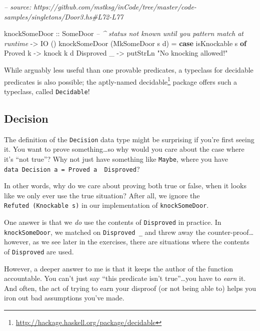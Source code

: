 \documentclass[]{article}
\newenvironment{Shaded}{}{}
\newcommand{\CommentTok}[1]{\textcolor[rgb]{0.38,0.63,0.69}{\textit{#1}}}
\newcommand{\DataTypeTok}[1]{\textcolor[rgb]{0.56,0.13,0.00}{#1}}
\newcommand{\FunctionTok}[1]{\textcolor[rgb]{0.02,0.16,0.49}{#1}}
\newcommand{\KeywordTok}[1]{\textcolor[rgb]{0.00,0.44,0.13}{\textbf{#1}}}
\newcommand{\NormalTok}[1]{#1}
\newcommand{\OtherTok}[1]{\textcolor[rgb]{0.00,0.44,0.13}{#1}}
\newcommand{\StringTok}[1]{\textcolor[rgb]{0.25,0.44,0.63}{#1}}
\renewcommand{\href}[2]{#2\footnote{\url{#1}}}
\begin{document}
\begin{Shaded}
\begin{Highlighting}[]
\CommentTok{-- source: https://github.com/mstksg/inCode/tree/master/code-samples/singletons/Door3.hs#L72-L77}

\NormalTok{knockSomeDoor}
\OtherTok{    ::} \DataTypeTok{SomeDoor}     \CommentTok{-- ^ status not known until you pattern match at runtime}
    \OtherTok{->} \DataTypeTok{IO}\NormalTok{ ()}
\NormalTok{knockSomeDoor (}\DataTypeTok{MkSomeDoor}\NormalTok{ s d) }\FunctionTok{=} \KeywordTok{case}\NormalTok{ isKnockable s }\KeywordTok{of}
    \DataTypeTok{Proved}\NormalTok{ k    }\OtherTok{->}\NormalTok{ knock k d}
    \DataTypeTok{Disproved}\NormalTok{ _ }\OtherTok{->}\NormalTok{ putStrLn }\StringTok{"No knocking allowed!"}
\end{Highlighting}
\end{Shaded}

While arguably less useful than one provable predicates, a typeclass for
decidable predicates is also possible; the aptly-named
\href{http://hackage.haskell.org/package/decidable}{decidable} package offers
such a typeclass, called \texttt{Decidable}!

\hypertarget{decision}{%
\subsection{Decision}\label{decision}}

The definition of the \texttt{Decision} data type might be surprising if you're
first seeing it. You want to prove something\ldots{}so why would you care about
the case where it's ``not true''? Why not just have something like
\texttt{Maybe}, where you have
\texttt{data\ Decision\ a\ =\ Proved\ a\ \textbar{}\ Disproved}?

In other words, why do we care about proving both true or false, when it looks
like we only ever use the true situation? After all, we ignore the
\texttt{Refuted\ (Knockable\ s)} in our implementation of
\texttt{knockSomeDoor}.

One answer is that we \emph{do} use the contents of \texttt{Disproved} in
practice. In \texttt{knockSomeDoor}, we matched on \texttt{Disproved\ \_} and
threw away the counter-proof\ldots{}however, as we see later in the exercises,
there are situations where the contents of \texttt{Disproved} are used.

However, a deeper answer to me is that it keeps the author of the function
accountable. You can't just say ``this predicate isn't true''\ldots{}you have to
\emph{earn} it. And often, the act of trying to earn your disproof (or not being
able to) helps you iron out bad assumptions you've made.
\end{document}
